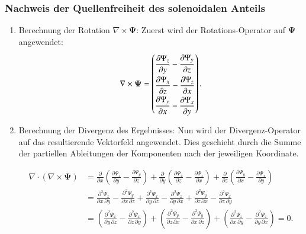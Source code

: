 \subsubsection{Nachweis der Quellenfreiheit des solenoidalen Anteils}

\begin{enumerate}
    \item Berechnung der Rotation $\nabla \times \boldsymbol{\Psi}$:
	Zuerst wird der Rotations-Operator auf $\boldsymbol{\Psi}$ angewendet:
    \[
    \nabla \times \boldsymbol{\Psi} =
	\renewcommand{\arraystretch}{2.0}
    \begin{pmatrix}
        \displaystyle\frac{\partial \Psi_z}{\partial y} - \frac{\partial \Psi_y}{\partial z} \\
        \displaystyle\frac{\partial \Psi_x}{\partial z} - \frac{\partial \Psi_z}{\partial x} \\
        \displaystyle\frac{\partial \Psi_y}{\partial x} - \frac{\partial \Psi_x}{\partial y}
    \end{pmatrix}.
    \]

    \item Berechnung der Divergenz des Ergebnisses: Nun wird der
    Divergenz-Operator auf das resultierende Vektorfeld angewendet.
    Dies geschieht durch die Summe der partiellen Ableitungen der
    Komponenten nach der jeweiligen Koordinate.
    
    \begin{align*}
    \nabla \cdot (\nabla \times \boldsymbol{\Psi}) &= \frac{\partial}{\partial x}\left( \frac{\partial \Psi_z}{\partial y} - \frac{\partial \Psi_y}{\partial z} \right) + \frac{\partial}{\partial y}\left( \frac{\partial \Psi_x}{\partial z} - \frac{\partial \Psi_z}{\partial x} \right) + \frac{\partial}{\partial z}\left( \frac{\partial \Psi_y}{\partial x} - \frac{\partial \Psi_x}{\partial y} \right) \\
    &= \frac{\partial^2 \Psi_z}{\partial x\, \partial y} - \frac{\partial^2 \Psi_y}{\partial x\, \partial z} + \frac{\partial^2 \Psi_x}{\partial y\, \partial z} - \frac{\partial^2 \Psi_z}{\partial y\, \partial x} + \frac{\partial^2 \Psi_y}{\partial z\, \partial x} - \frac{\partial^2 \Psi_x}{\partial z\, \partial y} \\
    &= \left( \frac{\partial^2 \Psi_x}{\partial y\, \partial z} - \frac{\partial^2 \Psi_x}{\partial z\, \partial y} \right) + \left( \frac{\partial^2 \Psi_y}{\partial z\, \partial x} - \frac{\partial^2 \Psi_y}{\partial x\, \partial z} \right) + \left( \frac{\partial^2 \Psi_z}{\partial x\, \partial y} - \frac{\partial^2 \Psi_z}{\partial y\, \partial x} \right) = 0.
    \end{align*}
    

\end{enumerate}

